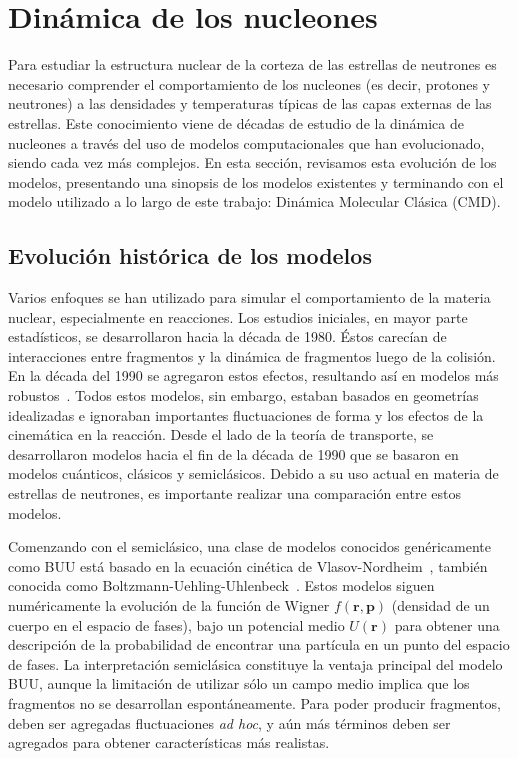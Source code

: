 \section{Dinámica de los nucleones}\label{sc:nucleon}
Para estudiar la estructura nuclear de la corteza de las estrellas de neutrones es necesario comprender el comportamiento de los nucleones (es decir, protones y neutrones) a las densidades y temperaturas típicas de las capas externas de las estrellas.
Este conocimiento viene de décadas de estudio de la dinámica de nucleones a través del uso de modelos computacionales que han evolucionado, siendo cada vez más complejos.
En esta sección, revisamos esta evolución de los modelos, presentando una sinopsis de los modelos existentes y terminando con el modelo utilizado a lo largo de este trabajo: Dinámica Molecular Clásica (CMD).

\subsection{Evolución histórica de los modelos}
Varios enfoques se han utilizado para simular el comportamiento de la materia nuclear, especialmente en reacciones.
Los estudios iniciales, en mayor parte estadísticos, se desarrollaron hacia la década de 1980.
Éstos carecían de interacciones entre fragmentos y la dinámica de fragmentos luego de la colisión.
En la década del 1990 se agregaron estos efectos, resultando así en modelos más robustos~\cite{barz_cluster_1996}.
Todos estos modelos, sin embargo, estaban basados en geometrías idealizadas e ignoraban importantes fluctuaciones de forma y los efectos de la cinemática en la reacción.
Desde el lado de la teoría de transporte, se desarrollaron modelos hacia el fin de la década de 1990 que se basaron en modelos cuánticos, clásicos y semiclásicos.
Debido a su uso actual en materia de estrellas de neutrones, es importante realizar una comparación entre estos modelos.

Comenzando con el semiclásico, una clase de modelos conocidos genéricamente como BUU está basado en la ecuación cinética de Vlasov-Nordheim~\cite{nordheim_kinetic_1928}, también conocida como Boltzmann-Uehling-Uhlenbeck~\cite{uehling_transport_1933}.
Estos modelos siguen numéricamente la evolución de la función de Wigner $f(\mathbf{r},\mathbf{p})$ (densidad de un cuerpo en el espacio de fases), bajo un potencial medio $U(\mathbf{r})$ para obtener una descripción de la probabilidad de encontrar una partícula en un punto del espacio de fases.
La interpretación semiclásica constituye la ventaja principal del modelo BUU, aunque la limitación de utilizar sólo un campo medio implica que los fragmentos no se desarrollan espontáneamente.
Para poder producir fragmentos, deben ser agregadas fluctuaciones \emph{ad hoc}, y aún más términos deben ser agregados para obtener características más realistas.

